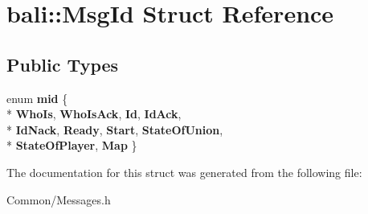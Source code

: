 \hypertarget{structbali_1_1_msg_id}{\section{bali\-:\-:Msg\-Id Struct Reference}
\label{structbali_1_1_msg_id}
}
\subsection*{Public Types}
\begin{DoxyCompactItemize}
\item 
enum {\bfseries mid} \{ \\*
{\bfseries Who\-Is}, 
{\bfseries Who\-Is\-Ack}, 
{\bfseries Id}, 
{\bfseries Id\-Ack}, 
\\*
{\bfseries Id\-Nack}, 
{\bfseries Ready}, 
{\bfseries Start}, 
{\bfseries State\-Of\-Union}, 
\\*
{\bfseries State\-Of\-Player}, 
{\bfseries Map}
 \}
\end{DoxyCompactItemize}


The documentation for this struct was generated from the following file\-:\begin{DoxyCompactItemize}
\item 
Common/Messages.\-h\end{DoxyCompactItemize}
